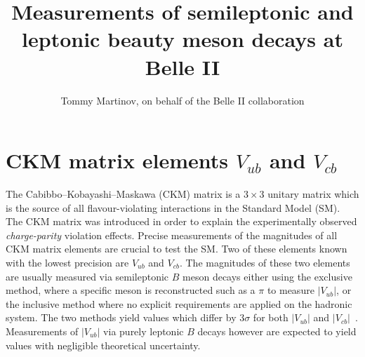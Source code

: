 \documentclass{moriond}
\def\vub{V_{ub}}
\def\vcb{V_{cb}}
\begin{document}
\vspace*{4cm}
\title{Measurements of semileptonic and leptonic beauty meson decays at Belle II}


\author{Tommy Martinov, on behalf of the Belle II collaboration}

\address{DESY, Notkestr. 85,\\
Hamburg 22607, Germany}

\maketitle{}

\section{CKM matrix elements $\vub$ and $\vcb$}
The Cabibbo–Kobayashi–Maskawa (CKM) matrix is a $3\times3$ unitary matrix which is the source of all flavour-violating interactions in the Standard Model (SM). The CKM matrix was introduced in order to explain the experimentally observed \textit{charge-parity} violation effects. Precise measurements of the magnitudes of all CKM matrix elements are crucial to test the SM. Two of these elements known with the lowest precision are $\vub$ and $\vcb$. The magnitudes of these two elements are usually measured via semileptonic $B$ meson decays either using the exclusive method, where a specific meson is reconstructed such as a $\pi$ to measure $|\vub|$, or the inclusive method where no explicit requirements are applied on the hadronic system. The two methods yield values which differ by $3\sigma$ for both $|\vub|$ and $|\vcb|$~\cite{hflav}. Measurements of $|\vub|$ via purely leptonic $B$ decays however are expected to yield values with negligible theoretical uncertainty.
\end{document}
